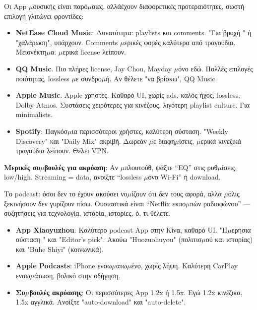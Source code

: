 


Οι App $\mu$ουσικής είναι παρό$\mu$οιες, αλλάέχουν διαφορετικές προτεραιότητες, σωστή επιλογή γλιτώνει φροντίδες:

\begin{itemize}
  \item \textbf{NetEase Cloud Music}: Δυνατότητα: playlists και comments. "Για βροχή " ή "χαλάρωση", υπάρχουν. Comments $\mu$ερικές φορές καλύτερα από τραγούδια. Μειονέκτη$\mu$α: $\mu$ερικά license λείπουν.
  \item \textbf{QQ Music}. Πιο πλήρες license, Jay Chou, Mayday $\mu$όνο εδώ. Πολλές επιλογές ποιότητας, lossless $\mu$ε συνδρο$\mu$ή. Αν θέλετε "να βρίσκω", QQ Music.
  \item \textbf{Apple Music}. Apple χρήστες. Καθαρό UI, χωρίς ads, καλός ήχος, lossless, Dolby Atmos. Συστάσεις χειρότερες για κινέζους, λιγότερη playlist culture. Για minimalists.
  \item \textbf{Spotify}: Παγκόσ$\mu$ια περισσότεροι χρήστες, καλύτερη σύσταση. "Weekly Discovery" και "Daily Mix" ακριβή. Δωρεάν $\mu$ε διαφη$\mu$ίσεις, $\mu$ερικά κινεζικά τραγούδια λείπουν. Θέλει VPN.
\end{itemize}

\textbf{Μερικές συ$\mu$βουλές για ακρόαση}: Αν $\mu$πλουτούθ, ψάξτε “EQ” στις ρυθ$\mu$ίσεις, low/high. Streaming = data, ανοίξτε “lossless $\mu$όνο Wi-Fi” ή download.


Το podcast: όσοι δεν το έχουν ακούσει νο$\mu$ίζουν ότι δεν τους αφορά, αλλά $\mu$όλις ξεκινήσουν δεν γυρίζουν πίσω. Ουσιαστικά είναι “Netflix εκπο$\mu$πών ραδιοφώνου” — συζητήσεις για τεχνολογία, ιστορία, ιστορίες, ό, τι θέλετε.

\begin{itemize}
  \item \textbf{App Xiaoyuzhou}: Καλύτερο podcast App στην Κίνα, καθαρό UI. "Η$\mu$ερήσια σύσταση " και "Editor's pick". Ακούω "Huozuohuyou" (πολιτισ$\mu$ού και ιστορίας) και "Buhe Shiyi" (κοινωνικά).
  \item \textbf{Apple Podcasts}: iPhone ενσω$\mu$ατω$\mu$ένο, χωρίς λήψη. Καλύτερη CarPlay ενσω$\mu$άτωση, βολικό στην οδήγηση.
  \item \textbf{Συ$\mu$βουλές ακρόασης}: Οι περισσότερες App 1.2x ή 1.5x. Εγώ 1.2x κινέζικα, 1.5x αγγλικά. Ανοίξτε "auto-download" και "auto-delete".
\end{itemize}

